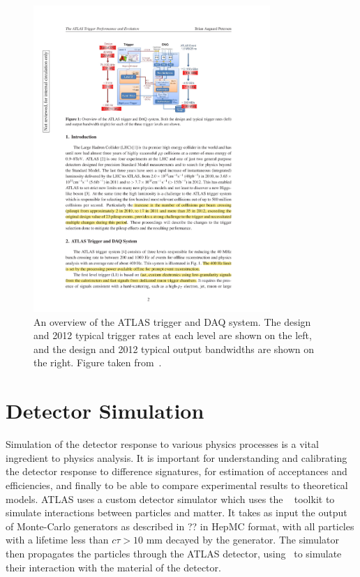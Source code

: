 \begin{figure}[h]
\centering
\includegraphics[width=0.8\textwidth]{trigger_overview}
\caption{An overview of the ATLAS trigger and DAQ system. The design and 2012
typical trigger rates at each level are shown on the left, and the design and
2012 typical output bandwidths are shown on the right. Figure taken
from~\cite{Petersen:1491585}.}
\label{fig:trigger_overview}
\end{figure}

\section{Detector Simulation}

Simulation of the detector response to various physics processes is a vital
ingredient to physics analysis. It is important for understanding and
calibrating the detector response to difference signatures, for estimation of
acceptances and efficiencies, and finally to be able to compare experimental
results to theoretical models. ATLAS uses a custom detector simulator which uses
the
\geant~\cite{Agostinelli2003250} toolkit to simulate interactions between
particles and matter. It takes as input the output of Monte-Carlo generators as described
in ?? in HepMC format, with all particles with a lifetime less than $c \tau >
10$ mm decayed by the generator. The simulator then propagates the particles
through the ATLAS detector, using \geant\ to simulate their interaction with the
material of the detector. 

